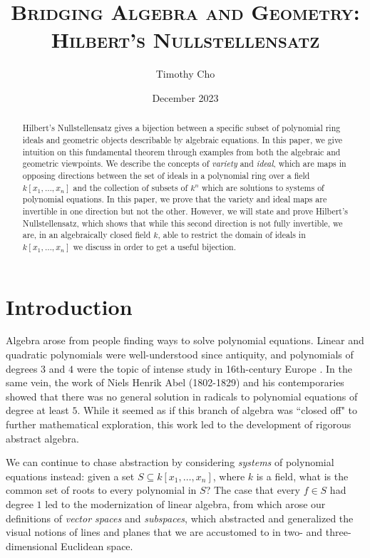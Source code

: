 \documentclass{article}
\title{\textsc{\Large{Bridging Algebra and Geometry: Hilbert's Nullstellensatz}}}
\author{Timothy Cho}
\date{December 2023}
\begin{document}
\maketitle
\begin{abstract}
Hilbert's Nullstellensatz gives a bijection between a specific subset of polynomial ring ideals and geometric objects describable by algebraic equations. In this paper, we give intuition on this fundamental theorem through examples from both the algebraic and geometric viewpoints. We describe the concepts of \textit{variety} and \textit{ideal}, which are maps in opposing directions between the set of ideals in a polynomial ring over a field $k[x_1,\ldots, x_n]$ and the collection of subsets of $k^n$ which are solutions to systems of polynomial equations. In this paper, we prove that the variety and ideal maps are invertible in one direction but not the other. However, we will state and prove Hilbert's Nullstellensatz, which shows that while this second direction is not fully invertible, we are, in an algebraically closed field $k$, able to restrict the domain of ideals in $k[x_1,\ldots, x_n]$ we discuss in order to get a useful bijection.
\end{abstract}


\section{Introduction}
Algebra arose from people finding ways to solve polynomial equations. Linear and quadratic polynomials were well-understood since antiquity, and polynomials of degrees $3$ and $4$ were the topic of intense study in 16th-century Europe \cite{waerden}. In the same vein, the work of Niels Henrik Abel (1802-1829) and his contemporaries showed that there was no general solution in radicals to polynomial equations of degree at least $5$. While it seemed as if this branch of algebra was ``closed off" to further mathematical exploration, this work led to the development of rigorous abstract algebra.

We can continue to chase abstraction by considering \textit{systems} of polynomial equations instead: given a set $S\subseteq k[x_1, \ldots, x_n]$, where $k$ is a field, what is the common set of roots to every polynomial in $S$? The case that every $f\in S$ had degree $1$ led to the modernization of linear algebra, from which arose our definitions of \textit{vector spaces} and \textit{subspaces}, which abstracted and generalized the visual notions of lines and planes that we are accustomed to in two- and three-dimensional Euclidean space.
\end{document}
